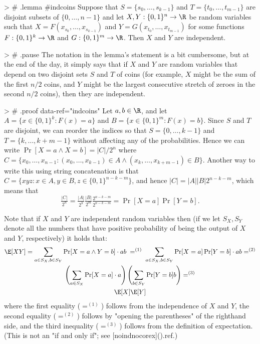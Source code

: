 > # {.lemma  #indcoins}
Suppose that $S=\{ s_0,\ldots, s_{k-1} \}$ and $T=\{ t_0 ,\ldots, t_{m-1} \}$ are disjoint subsets of $\{0,\ldots,n-1\}$ and let
$X,Y:\{0,1\}^n \rightarrow \R$ be random variables such that $X=F(x_{s_0},\ldots,x_{s_{k-1}})$ and $Y=G(x_{t_0},\ldots,x_{t_{m-1}})$ for some functions $F: \{0,1\}^k \rightarrow \R$ and $G: \{0,1\}^m \rightarrow \R$.
Then $X$ and $Y$ are independent.

> # { .pause }
The notation in the lemma's statement is a bit cumbersome, but at the end of the day, it simply says that if $X$ and $Y$ are random variables that depend on two disjoint sets $S$ and $T$ of coins (for example, $X$ might be the sum of the first $n/2$ coins, and $Y$ might be the largest consecutive stretch of zeroes in the second $n/2$ coins), then they are independent.

> # {.proof data-ref="indcoins"}
Let $a,b\in \R$, and let $A = \{ x \in \{0,1\}^k : F(x)=a \}$ and $B=\{ x\in \{0,1\}^m : F(x)=b \}$.
Since $S$ and $T$ are disjoint, we can reorder the indices so that $S = \{0,\ldots,k-1\}$ and $T=\{k,\ldots,k+m-1\}$ without affecting any of the probabilities.
Hence we can write $\Pr[X=a \wedge X=b] = |C|/2^n$ where $C= \{ x_0,\ldots,x_{n-1} : (x_0,\ldots,x_{k-1}) \in A \wedge (x_k,\ldots,x_{k+m-1}) \in B \}$.
Another way to write this using string concatenation is that $C = \{ xyz : x\in A, y\in B, z\in \{0,1\}^{n-k-m} \}$, and hence $|C|=|A||B|2^{n-k-m}$, which means that
$$
\tfrac{|C|}{2^n} = \tfrac{|A|}{2^k}\tfrac{|B|}{2^m}\tfrac{2^{n-k-m}}{2^{n-k-m}}=\Pr[X=a]\Pr[Y=b] .
$$



Note that if $X$ and $Y$ are independent random variables then (if we let $S_X,S_Y$ denote all the numbers that have positive probability of being the output of $X$ and $Y$, respectively) it holds that:
$$
\begin{gathered}
\E[ XY ] = \sum_{a \in S_X,b \in S_Y} {\textstyle\Pr[X=a \wedge Y=b]}\cdot ab \; =^{(1)} \; \sum_{a \in S_X,b \in S_Y} {\textstyle \Pr[X=a]\Pr[Y=b]}\cdot ab =^{(2)} \\
\left(\sum_{a \in S_X} {\textstyle \Pr[X=a]}\cdot a\right)\left(\sum_{b \in S_Y} {\textstyle \Pr[Y=b]}b\right) =^{(3)} \\
\E[X] \E[Y]
\end{gathered}
$$
where the first equality  ($=^{(1)}$) follows from the independence of $X$ and $Y$, the second equality ($=^{(2)}$) follows by "opening the parentheses" of the righthand side, and the third inequality ($=^{(3)}$) follows from the definition of expectation.
(This is not an "if and only if"; see [noindnocorex](){.ref}.)

